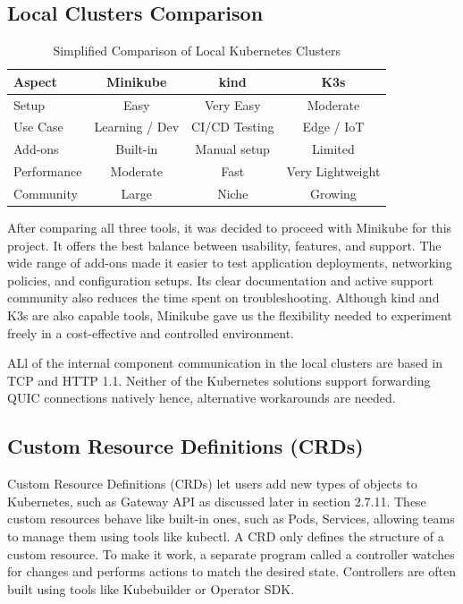 \subsection{Local Clusters Comparison}
\begin{table}[h]
\centering
\begin{tabular}{|l|c|c|c|}
\hline
\textbf{Aspect} & \textbf{Minikube} & \textbf{kind} & \textbf{K3s} \\
\hline
Setup & Easy & Very Easy & Moderate \\
Use Case & Learning / Dev & CI/CD Testing & Edge / IoT \\
Add-ons & Built-in & Manual setup & Limited \\
Performance & Moderate & Fast & Very Lightweight \\
Community & Large & Niche & Growing \\
\hline
\end{tabular}
\caption{Simplified Comparison of Local Kubernetes Clusters}
\end{table}


After comparing all three tools, it was decided to proceed with Minikube for this project. It offers the best balance between usability, features, and support. The wide range of add-ons made it easier to test application deployments, networking policies, and configuration setups. Its clear documentation and active support community also reduces the time spent on troubleshooting. Although kind and K3s are also capable tools, Minikube gave us the flexibility needed to experiment freely in a cost-effective and controlled environment.

ALl of the internal component communication in the local clusters are based in TCP and HTTP 1.1. Neither of the Kubernetes solutions support forwarding QUIC connections natively hence, alternative workarounds are needed.

\subsection{Custom Resource Definitions (CRDs)}
Custom Resource Definitions (CRDs) let users add new types of objects to Kubernetes, such as Gateway API as discussed later in section 2.7.11. These custom resources behave like built-in ones, such as Pods, Services, allowing teams to manage them using tools like kubectl. A CRD only defines the structure of a custom resource. To make it work, a separate program called a controller watches for changes and performs actions to match the desired state. Controllers are often built using tools like Kubebuilder or Operator SDK.


